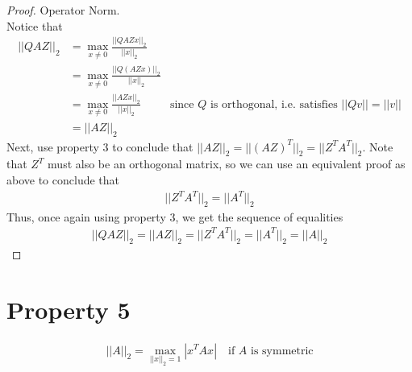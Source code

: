 \documentclass[10pt,a4paper]{article}
\theoremstyle{definition}
\theoremstyle{definition}
\numberwithin{equation}{section}
\begin{document}
\begin{proof} Operator Norm.
\\Notice that 
\begin{align*}
||QAZ||_2 &= \max_{x \neq 0} \frac{||QAZx||_2}{||x||_2}\\
&= \max_{x \neq 0} \frac{||Q(AZx)||_2}{||x||_2}\\
&= \max_{x \neq 0} \frac{||AZx||_2}{||x||_2} &\text{since $Q$ is orthogonal, i.e. satisfies $||Qv|| = ||v||$}\\
&= ||AZ||_2
\end{align*}
Next, use property 3 to conclude that $||AZ||_2 = ||(AZ)^T||_2 = ||Z^T A^T||_2$. Note that $Z^T$ must also be an orthogonal matrix, so we can use an equivalent proof as above to conclude that 
\begin{align*}
||Z^T A^T||_2 = ||A^T||_2
\end{align*}
Thus, once again using property 3, we get the sequence of equalities
\begin{align*}
||QAZ||_2 = ||AZ||_2 = ||Z^T A^T||_2 = ||A^T||_2 = ||A||_2
\end{align*}
\end{proof}

\section*{Property 5}
\begin{align*}
||A||_2 = \max_{||x||_2 = 1} |x^T A x| \quad \text{if $A$ is symmetric}
\end{align*}
\end{document}
